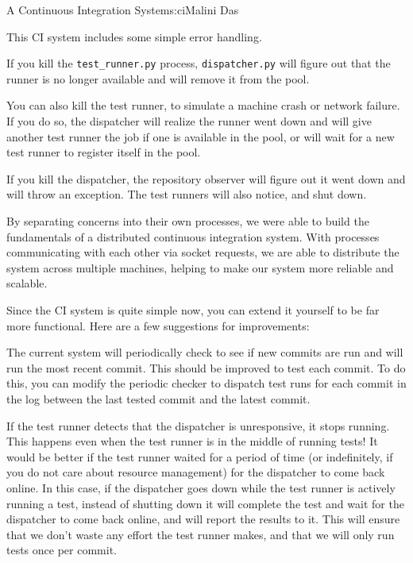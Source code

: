 \begin{aosachapter}{A Continuous Integration System}{s:ci}{Malini Das}
\label{error-handling}

This CI system includes some simple error handling.

If you kill the \texttt{test\_runner.py} process, \texttt{dispatcher.py}
will figure out that the runner is no longer available and will remove
it from the pool.

You can also kill the test runner, to simulate a machine crash or
network failure. If you do so, the dispatcher will realize the runner
went down and will give another test runner the job if one is available
in the pool, or will wait for a new test runner to register itself in
the pool.

If you kill the dispatcher, the repository observer will figure out it
went down and will throw an exception. The test runners will also
notice, and shut down.

\label{conclusion}

By separating concerns into their own processes, we were able to build
the fundamentals of a distributed continuous integration system. With
processes communicating with each other via socket requests, we are able
to distribute the system across multiple machines, helping to make our
system more reliable and scalable.

Since the CI system is quite simple now, you can extend it yourself to
be far more functional. Here are a few suggestions for improvements:

\label{per-commit-test-runs}

The current system will periodically check to see if new commits are run
and will run the most recent commit. This should be improved to test
each commit. To do this, you can modify the periodic checker to dispatch
test runs for each commit in the log between the last tested commit and
the latest commit.

\label{smarter-test-runners}

If the test runner detects that the dispatcher is unresponsive, it stops
running. This happens even when the test runner is in the middle of
running tests! It would be better if the test runner waited for a period
of time (or indefinitely, if you do not care about resource management)
for the dispatcher to come back online. In this case, if the dispatcher
goes down while the test runner is actively running a test, instead of
shutting down it will complete the test and wait for the dispatcher to
come back online, and will report the results to it. This will ensure
that we don't waste any effort the test runner makes, and that we will
only run tests once per commit.


\end{aosachapter}
